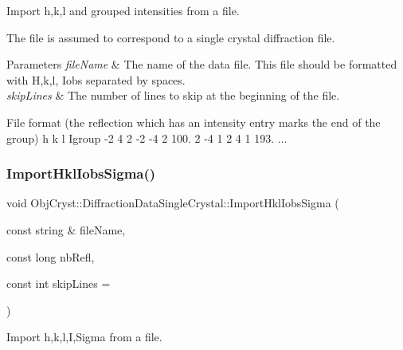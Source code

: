 Import h,k,l and grouped intensities from a file. 

The file is assumed to correspond to a single crystal diffraction file. 
\begin{DoxyParams}{Parameters}
{\em file\+Name} & The name of the data file. This file should be formatted with H,k,l, Iobs separated by spaces. \\
\hline
{\em skip\+Lines} & The number of lines to skip at the beginning of the file.\\
\hline
\end{DoxyParams}
File format (the reflection which has an intensity entry marks the end of the group) h k l Igroup -\/2 4 2 -\/2 -\/4 2 100. 2 -\/4 1 2 4 1 193. ... \mbox{\label{class_obj_cryst_1_1_diffraction_data_single_crystal_a041f22715b9b4d1f2beb2b7e387fa682}} 
\subsubsection{\texorpdfstring{ImportHklIobsSigma()}{ImportHklIobsSigma()}}
{\footnotesize\ttfamily void Obj\+Cryst\+::\+Diffraction\+Data\+Single\+Crystal\+::\+Import\+Hkl\+Iobs\+Sigma (\begin{DoxyParamCaption}\item[{const string \&}]{file\+Name,  }\item[{const long}]{nb\+Refl,  }\item[{const int}]{skip\+Lines = {} }\end{DoxyParamCaption})}



Import h,k,l,I,Sigma from a file. 

